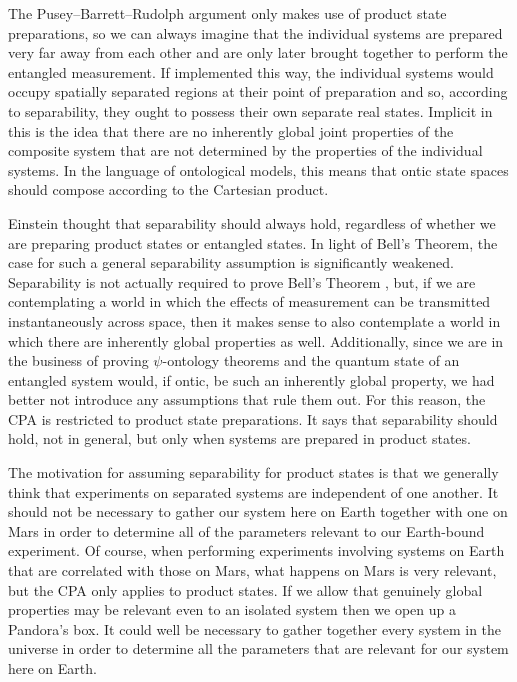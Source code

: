 \documentclass[DIV=calc,paper=a4,fontsize=11pt,twocolumn]{scrartcl} %
\theoremstyle{definition}
\theoremstyle{plain}
\begin{document}
The Pusey--Barrett--Rudolph argument only makes use of product state preparations, so we
can always imagine that the individual systems are prepared very far
away from each other and are only later brought together to perform
the entangled measurement.  If implemented this way, the individual
systems would occupy spatially separated regions at their point of
preparation and so, according to separability, they ought to possess
their own separate real states.  Implicit in this is the idea that
there are no inherently global joint properties of the composite
system that are not determined by the properties of the individual
systems.  In the language of ontological models, this means that ontic
state spaces should compose according to the Cartesian product.

Einstein thought that separability should always hold, regardless of
whether we are preparing product states or entangled states.  In light
of Bell's Theorem, the case for such a general separability assumption
is significantly weakened.  Separability is not actually required to
prove Bell's Theorem \cite{Henson2013}, but, if we are contemplating a
world in which the effects of measurement can be transmitted
instantaneously across space, then it makes sense to also contemplate
a world in which there are inherently global properties as well.
Additionally, since we are in the business of proving $\psi$-ontology
theorems and the quantum state of an entangled system would, if ontic,
be such an inherently global property, we had better not introduce any
assumptions that rule them out.  For this reason, the CPA is
restricted to product state preparations.  It says that separability
should hold, not in general, but only when systems are prepared in
product states.

The motivation for assuming separability for product states is that we
generally think that experiments on separated systems are independent
of one another.  It should not be necessary to gather our system here
on Earth together with one on Mars in order to determine all of the
parameters relevant to our Earth-bound experiment.  Of course, when
performing experiments involving systems on Earth that are correlated
with those on Mars, what happens on Mars is very relevant, but the CPA
only applies to product states.  If we allow that genuinely global
properties may be relevant even to an isolated system then we open up
a Pandora's box.  It could well be necessary to gather together every
system in the universe in order to determine all the parameters that
are relevant for our system here on Earth.
\end{document}
